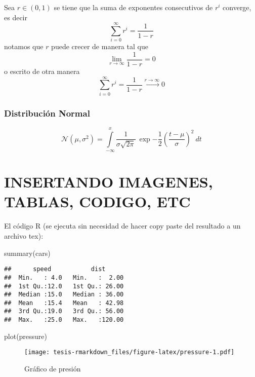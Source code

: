 \documentclass[12pt,reqno,oneside,pdftex]{formato-puc/puctesis} %
\newenvironment{Shaded}{\begin{snugshade}}{\end{snugshade}}
\newcommand{\FunctionTok}[1]{\textcolor[rgb]{0.00,0.00,0.00}{#1}}
\newcommand{\NormalTok}[1]{#1}
\begin{document}
Sea \(r\in (0,1)\) se tiene que la suma de exponentes consecutivos de
\(r^i\) converge, es decir \begin{equation}
\sum_{i=0}^{\infty} r^i = \frac{1}{1-r}
\end{equation} notamos que \(r\) puede crecer de manera tal que \[
\lim_{r\to \infty} \frac{1}{1-r} = 0
\] o escrito de otra manera \[
\sum_{i=0}^{\infty} r^i = \frac{1}{1-r} \stackrel{r\to \infty}{\longrightarrow} 0
\]

\hypertarget{distribuciuxf3n-normal}{%
\subsection{Distribución Normal}\label{distribuciuxf3n-normal}}

\begin{equation}
\mathcal{N}(\mu,\sigma^2) = \int\limits_{-\infty}^{x} \frac1{\sigma\sqrt{2\pi}}\: \exp{-\frac{1}{2}\left(\frac{t-\mu}{\sigma}\right)^2}\: dt
\end{equation}

\appendix

\chapter{INSERTANDO IMAGENES, TABLAS, CODIGO, ETC}

El código R (se ejecuta sin necesidad de hacer copy paste del resultado
a un archivo tex):

\begin{Shaded}
\begin{Highlighting}[]
\FunctionTok{summary}\NormalTok{(cars)}
\end{Highlighting}
\end{Shaded}

\begin{verbatim}
##      speed           dist       
##  Min.   : 4.0   Min.   :  2.00  
##  1st Qu.:12.0   1st Qu.: 26.00  
##  Median :15.0   Median : 36.00  
##  Mean   :15.4   Mean   : 42.98  
##  3rd Qu.:19.0   3rd Qu.: 56.00  
##  Max.   :25.0   Max.   :120.00
\end{verbatim}

\begin{Shaded}
\begin{Highlighting}[]
\FunctionTok{plot}\NormalTok{(pressure)}
\end{Highlighting}
\end{Shaded}

\begin{figure}
\centering
\texttt{[image: tesis-rmarkdown\_files/figure-latex/pressure-1.pdf]}
\caption{Gráfico de presión}
\end{figure}
\end{document}
